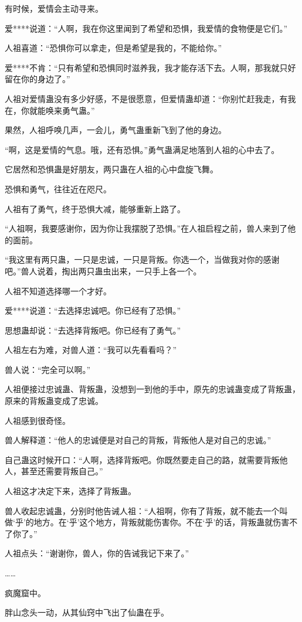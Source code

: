 \begin{this_body}
有时候，爱情会主动寻来。

爱****说道：“人啊，我在你这里闻到了希望和恐惧，我爱情的食物便是它们。”

人祖喜道：“恐惧你可以拿走，但是希望是我的，不能给你。”

爱****不肯：“只有希望和恐惧同时滋养我，我才能存活下去。人啊，那我就只好留在你的身边了。”

人祖对爱情蛊没有多少好感，不是很愿意，但爱情蛊却道：“你别忙赶我走，有我在，你就能唤来勇气蛊。”

果然，人祖呼唤几声，一会儿，勇气蛊重新飞到了他的身边。

“啊，这是爱情的气息。哦，还有恐惧。”勇气蛊满足地落到人祖的心中去了。

它居然和恐惧蛊是好朋友，两只蛊在人祖的心中盘旋飞舞。

恐惧和勇气，往往近在咫尺。

人祖有了勇气，终于恐惧大减，能够重新上路了。

“人祖啊，我要感谢你，因为你让我摆脱了恐惧。”在人祖启程之前，兽人来到了他的面前。

“我这里有两只蛊，一只是忠诚，一只是背叛。你选一个，当做我对你的感谢吧。”兽人说着，掏出两只蛊虫出来，一只手上各一个。

人祖不知道选择哪一个才好。

爱****说道：“去选择忠诚吧。你已经有了恐惧。”

思想蛊却说：“去选择背叛吧。你已经有了勇气。”

人祖左右为难，对兽人道：“我可以先看看吗？”

兽人说：“完全可以啊。”

人祖便接过忠诚蛊、背叛蛊，没想到一到他的手中，原先的忠诚蛊变成了背叛蛊，原来的背叛蛊变成了忠诚。

人祖感到很奇怪。

兽人解释道：“他人的忠诚便是对自己的背叛，背叛他人是对自己的忠诚。”

自己蛊这时候开口：“人啊，选择背叛吧。你既然要走自己的路，就需要背叛他人，甚至还需要背叛自己。”

人祖这才决定下来，选择了背叛蛊。

兽人收起忠诚蛊，分别时他告诫人祖：“人祖啊，你有了背叛，就不能去一个叫做‘乎’的地方。在‘乎’这个地方，背叛就能伤害你。不在‘乎’的话，背叛蛊就伤害不了你了。”

人祖点头：“谢谢你，兽人，你的告诫我记下来了。”

……

疯魔窟中。

胖山念头一动，从其仙窍中飞出了仙蛊在乎。


\end{this_body}
